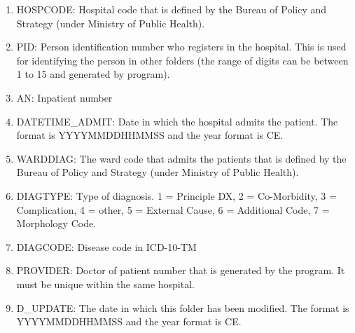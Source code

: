 \begin{enumerate}
  \item HOSPCODE: Hospital code that is defined by the Bureau of Policy and Strategy (under Ministry of Public Health). 
  \item PID: Person identification number who registers in the hospital. This is used for identifying the person in other folders (the range of digits can be between 1 to 15 and generated by program).
  \item AN: Inpatient number
  \item DATETIME\_ADMIT: Date in which the hospital admits the patient. The format is YYYYMMDDHHMMSS and the year format is CE.
  \item WARDDIAG: The ward code that admits the patients that is defined by the Bureau of Policy and Strategy (under Ministry of Public Health).
  \item DIAGTYPE: Type of diagnosis. 1 = Principle DX, 2 = Co-Morbidity, 3 = Complication, 4 = other, 5 = External Cause, 6 = Additional Code, 7 = Morphology Code.
  \item DIAGCODE: Disease code in ICD-10-TM
  \item PROVIDER: Doctor of patient number that is generated by the program. It must be unique within the same hospital.
  \item D\_UPDATE: The date in which this folder has been modified. The format is YYYYMMDDHHMMSS and the year format is CE.
\end{enumerate}
